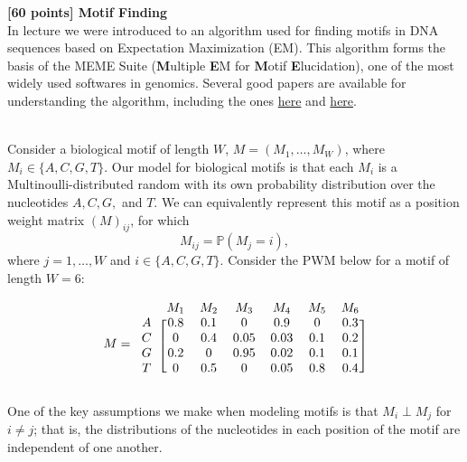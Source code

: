 
{\bf [60 points] Motif Finding}\\

In lecture we were introduced to an algorithm used for finding motifs in DNA sequences based on Expectation Maximization (EM). This algorithm forms the basis of the MEME Suite (\textbf{M}ultiple \textbf{E}M for \textbf{M}otif \textbf{E}lucidation), one of the most widely used softwares in genomics. Several good papers are available for understanding the algorithm, including the ones \href{https://www.cs.cmu.edu/~epxing/Class/10810-06/readings/MEME.pdf}{here} and \href{https://tlbailey.bitbucket.io/papers/meme.ml.pdf}{here}.

\\

Consider a biological motif of length $W$, $M = (M_1, \dots, M_W)$, where $M_i \in \{A, C, G, T\}$. Our model for biological motifs is that each $M_i$ is a Multinoulli-distributed random with its own probability distribution over the nucleotides $A, C, G,$ and $T$.
We can equivalently represent this motif as a position weight matrix $(M)_{ij}$, for which 
$$M_{ij} = \mathbb P(M_j = i),$$
where $j = 1, \dots, W$ and $i \in \{A, C, G, T\}$. Consider the PWM below for a motif of length $W=6$: 

\begin{equation}
M = \begin{blockarray}{ccccccc}
& M_1 & M_2 & M_3 & M_4 & M_5 & M_6 \\
\begin{block}{c[cccccc]}
  A & 0.8 & 0.1 & 0 & 0.9 & 0 & 0.3  \\
  C & 0 & 0.4 & 0.05 & 0.03 & 0.1 & 0.2 \\
  G & 0.2 & 0 & 0.95 & 0.02 & 0.1 & 0.1 \\
  T & 0 & 0.5 & 0 & 0.05 & 0.8 & 0.4  \\
\end{block}
\end{blockarray}
\label{q2-motif-pwm}
\end{equation}

One of the key assumptions we make when modeling motifs is that $M_i \perp M_j$ for $i \ne j$; that is, the distributions of the nucleotides in each position of the motif are independent of one another. 

